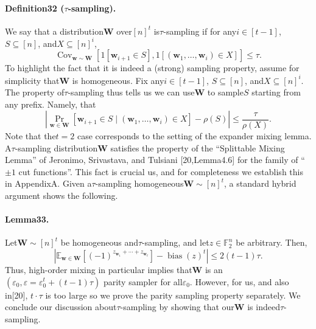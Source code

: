 \documentclass[10pt,a4paper]{article}
\DeclareMathOperator{\bias}{bias}
\DeclareMathOperator{\Cov}{Cov}
\begin{document}
\paragraph{Definition32 ($\tau$-sampling).} We say that a distribution$\mathbf W$ over$[n]^t$ is$\tau$-sampling if for any$i\in[t-1]$, $S\subseteq[n]$, and$X\subseteq[n]^i$,
\[\Cov_{\mathbf w\sim\mathbf W}[1[\mathbf w_{i+1}\in S],1[(\mathbf w_1,\ldots,\mathbf w_i)\in X]]\leq\tau.\]
To highlight the fact that it is indeed a (strong) sampling property, assume for simplicity that$\mathbf W$ is homogeneous. Fix any$i\in[t-1]$, $S\subseteq[n]$, and$X\subseteq[n]^i$. The property of$\tau$-sampling thus tells us we can use$\mathbf W$ to sample$S$ starting from any prefix. Namely, that
\[\left|\Pr_{\mathbf w\in\mathbf W}[\mathbf w_{i+1}\in S\mid(\mathbf w_1,\ldots,\mathbf w_i)\in X]-\rho(S)\right|\leq\frac\tau{\rho(X)}.\]
Note that the$t=2$ case corresponds to the setting of the expander mixing lemma.
A$\tau$-sampling distribution$\mathbf W$ satisfies the property of the ``Splittable Mixing Lemma'' of Jeronimo, Srivastava, and Tulsiani [20,Lemma4.6] for the family of ``$\pm1$ cut functions''. This fact is crucial us, and for completeness we establish this in AppendixA.
Given a$\tau$-sampling homogeneous$\mathbf W\sim[n]^t$, a standard hybrid argument shows the following.
\paragraph{Lemma33.} Let$\mathbf W\sim[n]^t$ be homogeneous and$\tau$-sampling, and let$z\in\mathbb F_2^n$ be arbitrary. Then,
\[\left|\mathbb E_{\mathbf w\in\mathbf W}[(-1)^{z_{\mathbf w_1}+\cdots+z_{\mathbf w_t}}]-\bias(z)^t\right|\leq2(t-1)\tau.\]
Thus, high-order mixing in particular implies that$\mathbf W$ is an$(\varepsilon_0,\varepsilon=\varepsilon_0^t+(t-1)\tau)$ parity sampler for all$\varepsilon_0$. However, for us, and also in[20], $t\cdot\tau$ is too large so we prove the parity sampling property separately.
We conclude our discussion about$\tau$-sampling by showing that our$\mathbf W$ is indeed$\tau$-sampling.
\end{document}
